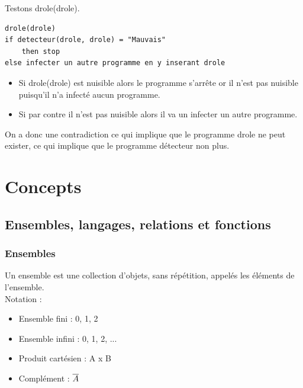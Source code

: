 Testons drole(drole).
\begin{lstlisting}
drole(drole)
if detecteur(drole, drole) = "Mauvais" 
	then stop
else infecter un autre programme en y inserant drole

\end{lstlisting}

\begin{itemize}
	\item Si drole(drole) est nuisible alors le programme s'arrête or il
	       	n'est pas nuisible puisqu'il n'a infecté aucun programme.
	\item Si par contre il n'est pas nuisible alors il va un infecter un 
		autre programme.
\end{itemize}
On a donc une contradiction ce qui implique que le programme drole ne peut 
exister, ce qui implique que  le programme détecteur non plus.


\section{Concepts}
\label{sec:concepts}


\subsection{Ensembles, langages, relations et fonctions}
\label{sub:ensembles_langages_relations_et_fonctions}

\subsubsection{Ensembles}
\label{ssub:ensembles}
Un ensemble est une collection d'objets, sans répétition, appelés les éléments
de l'ensemble.\\

Notation : 
\begin{itemize}
	\item Ensemble fini : { 0, 1, 2}
	\item Ensemble infini : { 0, 1, 2, ...}
	\item Produit cartésien : A x B
	\item Complément : $\overline{A}$
\end{itemize}


